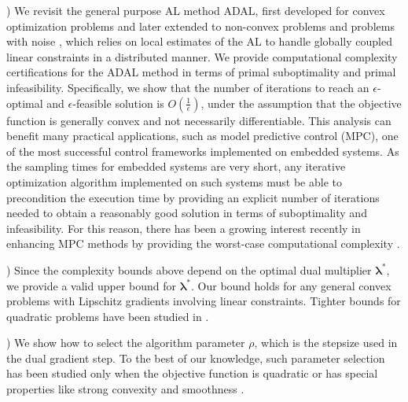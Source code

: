 \documentclass[doublecolumn]{IEEEtran}
\begin{document}
)  We revisit the general purpose AL method ADAL, first developed for convex optimization problems \cite{Nikos_math_prog,Nikos_ACC2015} and later extended to non-convex problems \cite{Nikos_nonconvexADAL} and problems with noise \cite{Nikos_SADAL}, which relies on local estimates of the AL to handle globally coupled linear constraints in a distributed manner.
We provide computational complexity certifications
for the ADAL method in terms of primal suboptimality and primal infeasibility.
Specifically, we show that
the number of iterations
to reach an $\epsilon$-optimal and $\epsilon$-feasible solution
is $O(\frac{1}{\epsilon})$, under the assumption that the objective function is generally convex and not necessarily differentiable.
This analysis can benefit many practical applications, such as model predictive control (MPC), one of the most successful control frameworks implemented on embedded systems.
As the sampling times for embedded systems are very short,
any iterative optimization algorithm implemented on such systems must be able to precondition the execution time  by providing an explicit number of iterations needed to obtain a reasonably good solution in terms of suboptimality and infeasibility.
For this reason, there has been a growing interest recently in enhancing MPC methods by providing the worst-case computational complexity \cite{RichterConf,RichterTAC,PatrinosTAC,PontusThesis,QuocInexact}.

) Since the complexity bounds above depend on the optimal dual multiplier ${\boldsymbol{\lambda}}^*$, we provide a valid upper bound for ${\boldsymbol{\lambda}}^*$.
Our bound holds for any general convex problems with Lipschitz gradients involving linear constraints.
Tighter bounds for quadratic problems have been studied in \cite{RichterConf,RichterTAC,PatrinosTAC}.

) We show how to select the algorithm parameter $\rho$, which is the stepsize used in the dual gradient step.
To the best of our knowledge, such parameter selection has been  studied
only when the objective function is quadratic or has special properties like strong convexity and smoothness \cite{PontusMetric,admmParam}.
\end{document}
